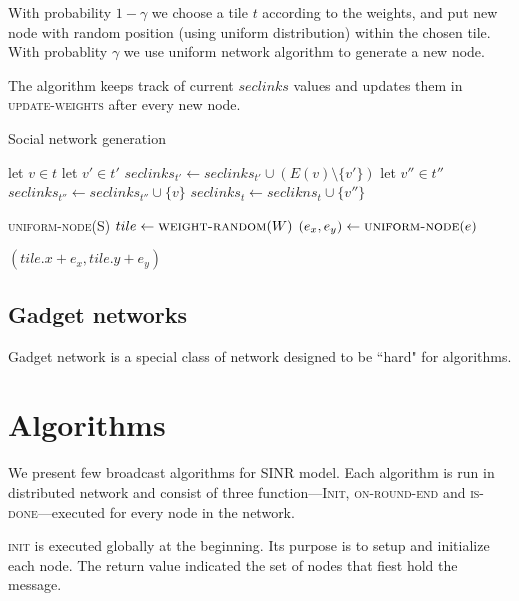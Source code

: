\documentclass[a4paper,draft,12pt]{report}
\begin{document}
With probability $1 - \gamma$ we choose a tile $t$ according to the weights, and put new node with random position (using uniform distribution) within the chosen tile. With probablity $\gamma$ we use uniform network algorithm to generate a new node.

The algorithm keeps track of current $seclinks$ values and updates them in \textsc{update-weights} after every new node.

\begin{algorithm}
\caption{Social network generation}
\label{a:social}
\begin{algorithmic}
	\State let $v \in t$
		\State let $v' \in t'$
		\State $seclinks_{t'} \gets seclinks_{t'} \cup (E(v)  \setminus \{v'\})$
				\State let $v'' \in t''$
				\State $seclinks_{t''} \gets seclinks_{t''} \cup \{v\}$
				\State $seclinks_t \gets seclikns_t \cup \{v''\}$
			\EndIf
		\EndFor
	\EndFor
\EndFunction

\Statex

		\State \Return \textsc{uniform-node}(S)
	\Else
		\State $tile \gets \textsc{weight-random}(W)$
		\State $(e_x, e_y) \gets \textsc{uniform-node}(e)$
		
		\State \Return $(tile.x + e_x, tile.y + e_y)$
	\EndIf
\EndFunction
\end{algorithmic}
\end{algorithm}

\section{Gadget networks}

Gadget network is a special class of network designed to be  ``hard" for algorithms.

\chapter{Algorithms}

We present few broadcast algorithms for SINR model. Each algorithm is run in distributed network and consist of three function---\textsc{Init}, \textsc{on-round-end} and \textsc{is-done}---executed for every node in the network.

\textsc{init} is executed globally at the beginning. Its purpose is to setup and initialize each node. The return value indicated the set of nodes that fiest hold the message.
\end{document}
